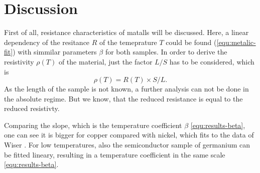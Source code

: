 \section{Discussion}
\label{sec:Discussion}


First of all, resistance characteristics of matalls will be discussed.
Here, a linear dependency of the resitance $R$ of the temeprature $T$ could be found (\ref{equ:metalic-fit}) with simmilar parameters $\beta$ for both samples.
In order to derive the resistivity $\rho(T)$ of the material, just the factor $L/S$ has to be considered,
which is 
\begin{equation}
    \rho(T) = R(T) \times S/L.
\end{equation}
As the length of the sample is not known, a further analysis can not be done in the absolute regime.
But we know, that the reduced resistance is equal to the reduced resistivty.

Comparing the slope, which is the temperature coefficient $\beta$ \ref{equ:results-beta}, one can see it is bigger for copper compared with nickel, which fits to the data of Wiser \cite{resistivity}.
For low temperatures, also the semiconductor sample of germanium can be fitted lineary, resulting in a temperature coefficient in the same scale \ref{equ:results-beta}.

